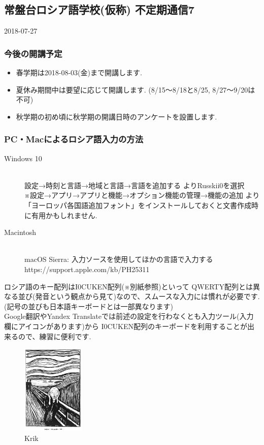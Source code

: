 \documentclass[uplatex,11pt]{jsarticle}
\begin{document}
\subsection*{常盤台ロシア語学校(仮称) 不定期通信7}
\begin{flushright}
  2018-07-27
\end{flushright}
\subsubsection*{今後の開講予定}
\begin{itemize}
  \item 春学期は2018-08-03(金)まで開講します.
  \item 夏休み期間中は要望に応じて開講します. (8/15～8/18と8/25, 8/27～9/20は不可)
  \item 秋学期の初め頃に秋学期の開講日時のアンケートを設置します.
\end{itemize}
\subsubsection*{PC・Macによるロシア語入力の方法}
\begin{description}
  \item[Windows 10]\mbox{}\\
    設定→時刻と言語→地域と言語→言語を追加する よりRusski{i0}を選択 \\
    ※設定→アプリ→アプリと機能→オプション機能の管理→機能の追加 より「ヨーロッパ各国語追加フォント」をインストールしておくと文書作成時に有用かもしれません.
  \item[Macintosh]\mbox{}\\
    macOS Sierra: 入力ソースを使用してほかの言語で入力する \\
    https://support.apple.com/kb/PH25311
\end{description}
ロシア語のキー配列は{I0}CUKEN配列(※別紙参照)といって
QWERTY配列とは異なる並び(発音という観点から見て)なので、スムースな入力には慣れが必要です. (記号の並びも日本語キーボードとは一部異なります) \\
Google翻訳やYandex Translateでは前述の設定を行わなくとも入力ツール(入力欄にアイコンがあります)から
{I0}CUKEN配列のキーボードを利用することが出来るので、練習に便利です.
\begin{figure}
\centering
\includegraphics[width=30mm,bb=0 0 279 400]{_The_scream_._Wellcome_L0011212.jpg}
\caption{\flqq{}Krik\frqq}
\end{figure}
\end{document}
